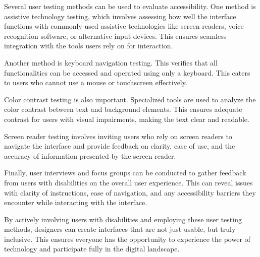 Several user testing methods can be used to evaluate accessibility. One method
is assistive technology testing, which involves assessing how well the interface
functions with commonly used assistive technologies like screen readers, voice
recognition software, or alternative input devices. This ensures seamless
integration with the tools users rely on for interaction.

Another method is keyboard navigation testing. This verifies that all
functionalities can be accessed and operated using only a keyboard. This caters
to users who cannot use a mouse or touchscreen effectively.

Color contrast testing is also important. Specialized tools are used to analyze
the color contrast between text and background elements. This ensures adequate
contrast for users with visual impairments, making the text clear and readable.

Screen reader testing involves inviting users who rely on screen readers to
navigate the interface and provide feedback on clarity, ease of use, and the
accuracy of information presented by the screen reader.

Finally, user interviews and focus groups can be conducted to gather feedback
from users with disabilities on the overall user experience. This can reveal
issues with clarity of instructions, ease of navigation, and any accessibility
barriers they encounter while interacting with the interface.

By actively involving users with disabilities and employing these user testing
methods, designers can create interfaces that are not just usable, but truly
inclusive. This ensures everyone has the opportunity to experience the power of
technology and participate fully in the digital landscape.
